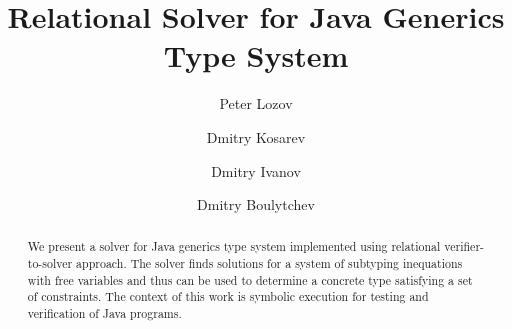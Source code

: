 \documentclass[runningheads]{llncs}
\begin{document}
%
\title{Relational Solver for Java Generics Type System}
%
%
\author{
  Peter Lozov \and
  Dmitry Kosarev \and
  Dmitry Ivanov\and
  Dmitry Boulytchev
}
%
%
%
\maketitle              %
%
\begin{abstract}
  We present a solver for Java generics type system implemented using relational verifier-to-solver
  approach. The solver finds solutions for a system of subtyping inequations with free variables
  and thus can be used to determine a concrete type satisfying a set of constraints. The
  context of this work is symbolic execution for testing and verification of Java programs.
\end{abstract}
%
%
%








%
%
%


%
\end{document}
